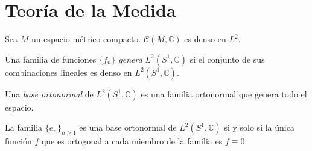 \section{Teoría de la Medida}

\begin{teorema}
	Sea $M$ un espacio métrico compacto. $\mathcal{C}(M,\mathbb{C})$ es denso en $L^2$.
\end{teorema}

\cite{upennpdfL2}

\begin{definicion}
	Una familia de funciones $\{f_n\}$ \textit{genera} $L^2(S^1,\mathbb{C})$ si el conjunto de sus combinaciones lineales es denso en $L^2(S^1,\mathbb{C})$.
\end{definicion}

\begin{definicion}
	Una \textit{base ortonormal} de $L^2(S^1,\mathbb{C})$ es una familia ortonormal que genera todo el espacio.
\end{definicion}

\begin{lema}
	La familia $\{e_n\}_{n \geq 1}$ es una base ortonormal de $L^2(S^1,\mathbb{C})$ si y solo si la única función $f$ que es ortogonal a cada miembro de la familia es $f \equiv 0$.
\end{lema}

